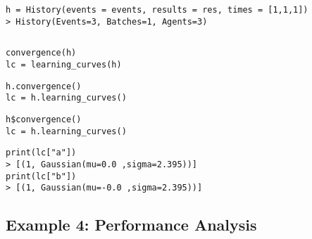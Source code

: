 \documentclass[article]{jss}
\newif\ifen
\newif\ifes
\newcommand{\en}[1]{\ifen#1\fi}
\newcommand{\es}[1]{\ifes#1\fi}
\begin{document}
\begin{lstlisting}[backgroundcolor=\color{all}]
h = History(events = events, results = res, times = [1,1,1])
> History(Events=3, Batches=1, Agents=3)
\end{lstlisting}
%
\en{The history now contains the same 3 events and 3 agents but grouped in the same batche.}
\es{La historia ahora contiene los mismo 3 eventos y 3 agentes pero agrupados en un mismo bache.}
%
\en{Although the dynamic factor is positive, due to the default values of the environment, the estimates converge to the same values we reported previously.}
\es{A pesar de que el factor dinámico es positivo, debido a los valores por defecto del environment, las estimaciones convergen a los mismos valores que reportamos previamente.}
%
\begin{lstlisting}[backgroundcolor=\color{white},label=lst:one:batch_output, caption=\relax, belowskip=-1.0 \baselineskip, aboveskip=-0 \baselineskip]
\end{lstlisting}
\begin{paracol}{3}
\begin{lstlisting}[backgroundcolor=\color{julia}, belowskip=-0.77 \baselineskip]
convergence(h)
lc = learning_curves(h)
\end{lstlisting}
  \switchcolumn
\begin{lstlisting}[backgroundcolor=\color{python}, belowskip=-0.77 \baselineskip]
h.convergence()
lc = h.learning_curves()
\end{lstlisting}
   \switchcolumn
\begin{lstlisting}[backgroundcolor=\color{r}, belowskip=-0.77 \baselineskip]
h$convergence()
lc = h.learning_curves()
\end{lstlisting}
\end{paracol}
\begin{lstlisting}[backgroundcolor=\color{all}]
print(lc["a"])
> [(1, Gaussian(mu=0.0 ,sigma=2.395))]
print(lc["b"])
> [(1, Gaussian(mu=-0.0 ,sigma=2.395))]
\end{lstlisting}
%
\en{The only difference is that the system reports only one estimate per batch.}
\es{La única diferencia es que el sistema reporta una única estimación por bache.}




\subsection{Example 4: Performance Analysis}
\end{document}
